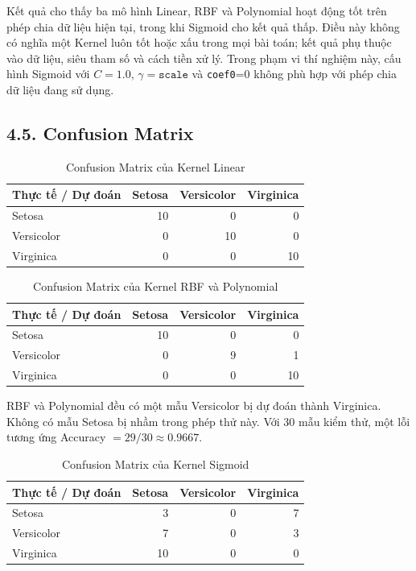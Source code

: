 \documentclass{article}
\begin{document}
	Kết quả cho thấy ba mô hình Linear, RBF và Polynomial hoạt động tốt trên phép chia dữ liệu hiện tại, trong khi Sigmoid cho kết quả thấp. Điều này không có nghĩa một Kernel luôn tốt hoặc xấu trong mọi bài toán; kết quả phụ thuộc vào dữ liệu, siêu tham số và cách tiền xử lý. Trong phạm vi thí nghiệm này, cấu hình Sigmoid với $C=1.0$, $\gamma=\texttt{scale}$ và \texttt{coef0}=0 không phù hợp với phép chia dữ liệu đang sử dụng.
	
	\subsection{4.5. Confusion Matrix}
	
	\begin{table}[H]
		\centering
		\caption{Confusion Matrix của Kernel Linear}
		\label{tab:cmlinear}
		\begin{tabular}{lrrr}
			\toprule
			\textbf{Thực tế / Dự đoán} & \textbf{Setosa} & \textbf{Versicolor} & \textbf{Virginica}\\
			\midrule
			Setosa & 10 & 0 & 0\\
			Versicolor & 0 & 10 & 0\\
			Virginica & 0 & 0 & 10\\
			\bottomrule
		\end{tabular}
	\end{table}
	
	\begin{table}[H]
		\centering
		\caption{Confusion Matrix của Kernel RBF và Polynomial}
		\label{tab:cmrbfpoly}
		\begin{tabular}{lrrr}
			\toprule
			\textbf{Thực tế / Dự đoán} & \textbf{Setosa} & \textbf{Versicolor} & \textbf{Virginica}\\
			\midrule
			Setosa & 10 & 0 & 0\\
			Versicolor & 0 & 9 & 1\\
			Virginica & 0 & 0 & 10\\
			\bottomrule
		\end{tabular}
	\end{table}
	
	RBF và Polynomial đều có một mẫu Versicolor bị dự đoán thành Virginica. Không có mẫu Setosa bị nhầm trong phép thử này. Với 30 mẫu kiểm thử, một lỗi tương ứng Accuracy $=29/30\approx0.9667$.
	
	\begin{table}[H]
		\centering
		\caption{Confusion Matrix của Kernel Sigmoid}
		\label{tab:cmsigmoid}
		\begin{tabular}{lrrr}
			\toprule
			\textbf{Thực tế / Dự đoán} & \textbf{Setosa} & \textbf{Versicolor} & \textbf{Virginica}\\
			\midrule
			Setosa & 3 & 0 & 7\\
			Versicolor & 7 & 0 & 3\\
			Virginica & 10 & 0 & 0\\
			\bottomrule
		\end{tabular}
	\end{table}
	
\end{document}

